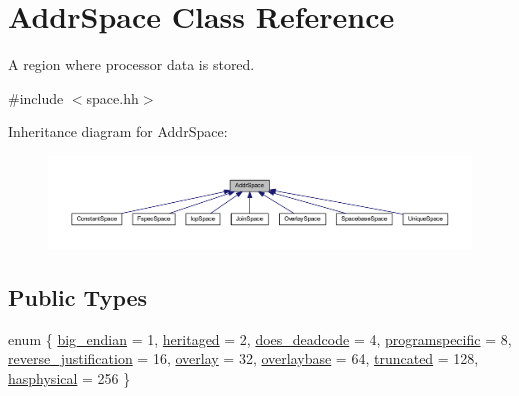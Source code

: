 \hypertarget{class_addr_space}{}\section{Addr\+Space Class Reference}
\label{class_addr_space}


A region where processor data is stored.  




{\ttfamily \#include $<$space.\+hh$>$}



Inheritance diagram for Addr\+Space\+:
\nopagebreak
\begin{figure}[H]
\begin{center}
\leavevmode
\includegraphics[width=350pt]{class_addr_space__inherit__graph}
\end{center}
\end{figure}
\subsection*{Public Types}
\begin{DoxyCompactItemize}
\item 
enum \{ \newline
\mbox{\hyperlink{class_addr_space_a6ad7f9e9380cecbb8c2295e2f427fc10a8d907075fd50528d0ac10d43af899be2}{big\+\_\+endian}} = 1, 
\mbox{\hyperlink{class_addr_space_a6ad7f9e9380cecbb8c2295e2f427fc10aaa1675e833af050897d4ad66c138f1b4}{heritaged}} = 2, 
\mbox{\hyperlink{class_addr_space_a6ad7f9e9380cecbb8c2295e2f427fc10aeb1ab5b0f82801bfb177916a2b902fe6}{does\+\_\+deadcode}} = 4, 
\mbox{\hyperlink{class_addr_space_a6ad7f9e9380cecbb8c2295e2f427fc10ae26a47a5510e05c1ca0ab8ec2ee0b72b}{programspecific}} = 8, 
\newline
\mbox{\hyperlink{class_addr_space_a6ad7f9e9380cecbb8c2295e2f427fc10abb22ff2778e1876ccf90657fc6df801f}{reverse\+\_\+justification}} = 16, 
\mbox{\hyperlink{class_addr_space_a6ad7f9e9380cecbb8c2295e2f427fc10a7820728fd72194c3c22534c0d814ab76}{overlay}} = 32, 
\mbox{\hyperlink{class_addr_space_a6ad7f9e9380cecbb8c2295e2f427fc10ae8c7fcb8745b27504eb57262b2936d4b}{overlaybase}} = 64, 
\mbox{\hyperlink{class_addr_space_a6ad7f9e9380cecbb8c2295e2f427fc10ad16f38794d350a82a0af64e95b933f50}{truncated}} = 128, 
\newline
\mbox{\hyperlink{class_addr_space_a6ad7f9e9380cecbb8c2295e2f427fc10a91dce97e6f6b850d04eb182edde6e2c6}{hasphysical}} = 256
 \}
\end{DoxyCompactItemize}
